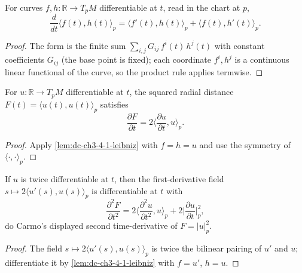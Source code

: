\begin{lemma}
  \label{lem:dc-ch3-4-1-leibniz}
  \leanok
  For curves $f,h:\mathbb{R}\to T_pM$ differentiable at $t$, read in the chart at
  $p$,
  $$\frac{d}{dt}\langle f(t),h(t)\rangle_p
    = \langle f'(t),h(t)\rangle_p + \langle f(t),h'(t)\rangle_p.$$
\end{lemma}
\begin{proof}
  \leanok
  The form is the finite sum $\sum_{i,j}G_{ij}\,f^i(t)\,h^j(t)$ with constant
  coefficients $G_{ij}$ (the base point is fixed); each coordinate $f^i,h^j$ is a
  continuous linear functional of the curve, so the product rule applies termwise.
\end{proof}

\begin{lemma}
  \label{lem:dc-ch3-4-1-dF}
  \leanok
  For $u:\mathbb{R}\to T_pM$ differentiable at $t$, the squared radial distance
  $F(t)=\langle u(t),u(t)\rangle_p$ satisfies
  $$\frac{\partial F}{\partial t}=2\Big\langle\frac{\partial u}{\partial t},u\Big\rangle_p.$$
\end{lemma}
\begin{proof}
  \leanok
  Apply \cref{lem:dc-ch3-4-1-leibniz} with $f=h=u$ and use the symmetry of
  $\langle\cdot,\cdot\rangle_p$.
\end{proof}

\begin{lemma}
  \label{lem:dc-ch3-4-1-ddF}
  \leanok
  If $u$ is twice differentiable at $t$, then the first-derivative field
  $s\mapsto 2\langle u'(s),u(s)\rangle_p$ is differentiable at $t$ with
  $$\frac{\partial^2 F}{\partial t^2}
    = 2\Big\langle\frac{\partial^2 u}{\partial t^2},u\Big\rangle_p
      + 2\Big|\frac{\partial u}{\partial t}\Big|_p^2,$$
  do Carmo's displayed second time-derivative of $F=|u|_p^2$.
\end{lemma}
\begin{proof}
  \leanok
  The field $s\mapsto 2\langle u'(s),u(s)\rangle_p$ is twice the bilinear pairing
  of $u'$ and $u$; differentiate it by \cref{lem:dc-ch3-4-1-leibniz} with
  $f=u'$, $h=u$.
\end{proof}

